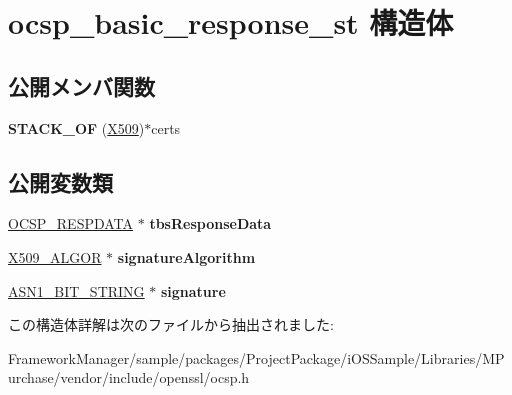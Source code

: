 \hypertarget{structocsp__basic__response__st}{}\section{ocsp\+\_\+basic\+\_\+response\+\_\+st 構造体}
\label{structocsp__basic__response__st}
\subsection*{公開メンバ関数}
\begin{DoxyCompactItemize}
\item 
\hypertarget{structocsp__basic__response__st_af487e2c8bcee7ce6d8ace295f89e8e9a}{}{\bfseries S\+T\+A\+C\+K\+\_\+\+O\+F} (\hyperlink{structx509__st}{X509})$\ast$certs\label{structocsp__basic__response__st_af487e2c8bcee7ce6d8ace295f89e8e9a}

\end{DoxyCompactItemize}
\subsection*{公開変数類}
\begin{DoxyCompactItemize}
\item 
\hypertarget{structocsp__basic__response__st_a09c6bafbf175745b5919a3e15055354c}{}\hyperlink{structocsp__response__data__st}{O\+C\+S\+P\+\_\+\+R\+E\+S\+P\+D\+A\+T\+A} $\ast$ {\bfseries tbs\+Response\+Data}\label{structocsp__basic__response__st_a09c6bafbf175745b5919a3e15055354c}

\item 
\hypertarget{structocsp__basic__response__st_aaf4560b99757f89823b63d97c5e5487b}{}\hyperlink{struct_x509__algor__st}{X509\+\_\+\+A\+L\+G\+O\+R} $\ast$ {\bfseries signature\+Algorithm}\label{structocsp__basic__response__st_aaf4560b99757f89823b63d97c5e5487b}

\item 
\hypertarget{structocsp__basic__response__st_afce61e2065685eaea0d539e366fe3cee}{}\hyperlink{structasn1__string__st}{A\+S\+N1\+\_\+\+B\+I\+T\+\_\+\+S\+T\+R\+I\+N\+G} $\ast$ {\bfseries signature}\label{structocsp__basic__response__st_afce61e2065685eaea0d539e366fe3cee}

\end{DoxyCompactItemize}


この構造体詳解は次のファイルから抽出されました\+:\begin{DoxyCompactItemize}
\item 
Framework\+Manager/sample/packages/\+Project\+Package/i\+O\+S\+Sample/\+Libraries/\+M\+Purchase/vendor/include/openssl/ocsp.\+h\end{DoxyCompactItemize}
